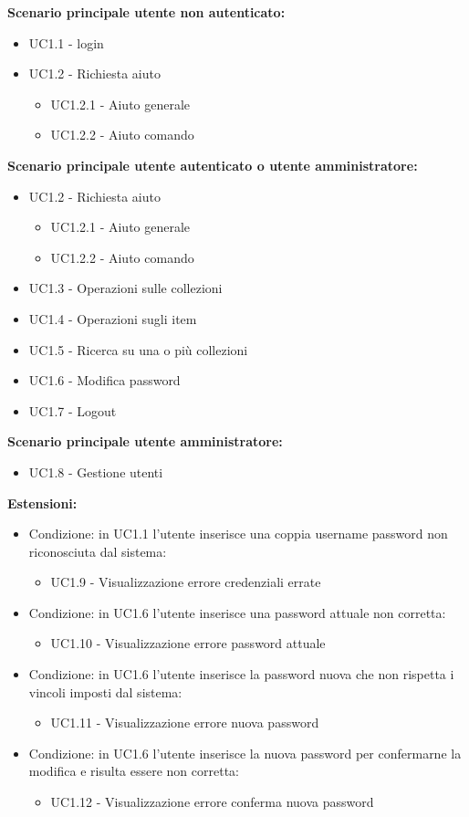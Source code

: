 \documentclass{scalatekids-article}
\begin{document}
\textbf{Scenario principale utente non autenticato:} 
\begin{itemize}
  \item UC1.1 - login
  \item UC1.2 - Richiesta aiuto
  \begin{itemize}
    \item UC1.2.1 - Aiuto generale
    \item UC1.2.2 - Aiuto comando
  \end{itemize}
\end{itemize}
\textbf{Scenario principale utente autenticato o utente amministratore:} 
\begin{itemize}
  \item UC1.2 - Richiesta aiuto
  \begin{itemize}
    \item UC1.2.1 - Aiuto generale
    \item UC1.2.2 - Aiuto comando
  \end{itemize}
  \item UC1.3 - Operazioni sulle collezioni
  \item UC1.4 - Operazioni sugli item
  \item UC1.5 - Ricerca su una o più collezioni
  \item UC1.6 - Modifica password
  \item UC1.7 - Logout
\end{itemize}
\textbf{Scenario principale utente amministratore:} 
\begin{itemize}
  \item UC1.8 - Gestione utenti
\end{itemize}
\textbf{Estensioni:}
\begin{itemize}
  \item Condizione: in UC1.1 l'utente inserisce una coppia username password non riconosciuta dal sistema:
  \begin{itemize}
    \item UC1.9 - Visualizzazione errore credenziali errate
  \end{itemize}
  \item Condizione: in UC1.6 l'utente inserisce una password attuale non corretta:
  \begin{itemize}
    \item UC1.10 - Visualizzazione errore password attuale
  \end{itemize}
  \item Condizione: in UC1.6 l'utente inserisce la password nuova che non rispetta i vincoli imposti dal sistema: %
  \begin{itemize}
    \item UC1.11 - Visualizzazione errore nuova password
  \end{itemize}
  \item Condizione: in UC1.6 l'utente inserisce la nuova password per confermarne la modifica e risulta essere non corretta: %
  \begin{itemize}
    \item UC1.12 - Visualizzazione errore conferma nuova password
  \end{itemize}
\end{itemize}
\end{document}

